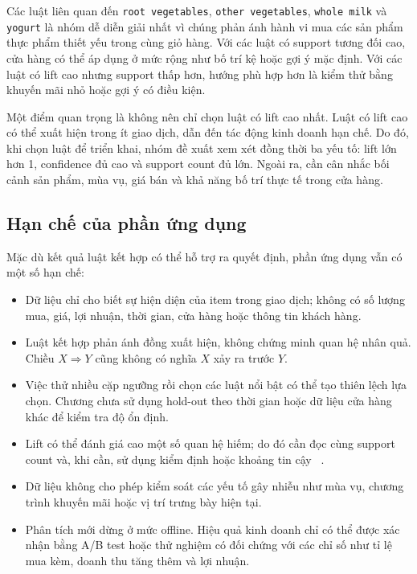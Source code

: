Các luật liên quan đến \texttt{root vegetables}, \texttt{other vegetables}, \texttt{whole milk} và \texttt{yogurt} là nhóm dễ diễn giải nhất vì chúng phản ánh hành vi mua các sản phẩm thực phẩm thiết yếu trong cùng giỏ hàng. Với các luật có support tương đối cao, cửa hàng có thể áp dụng ở mức rộng như bố trí kệ hoặc gợi ý mặc định. Với các luật có lift cao nhưng support thấp hơn, hướng phù hợp hơn là kiểm thử bằng khuyến mãi nhỏ hoặc gợi ý có điều kiện.

Một điểm quan trọng là không nên chỉ chọn luật có lift cao nhất. Luật có lift cao có thể xuất hiện trong ít giao dịch, dẫn đến tác động kinh doanh hạn chế. Do đó, khi chọn luật để triển khai, nhóm đề xuất xem xét đồng thời ba yếu tố: lift lớn hơn 1, confidence đủ cao và support count đủ lớn. Ngoài ra, cần cân nhắc bối cảnh sản phẩm, mùa vụ, giá bán và khả năng bố trí thực tế trong cửa hàng.

\subsection{Hạn chế của phần ứng dụng}
\label{subsec:application-limitations}

Mặc dù kết quả luật kết hợp có thể hỗ trợ ra quyết định, phần ứng dụng vẫn có một số hạn chế:

\begin{itemize}
    \item Dữ liệu chỉ cho biết sự hiện diện của item trong giao dịch; không có
          số lượng mua, giá, lợi nhuận, thời gian, cửa hàng hoặc thông tin khách
          hàng.
    \item Luật kết hợp phản ánh đồng xuất hiện, không chứng minh quan hệ nhân
          quả. Chiều $X\Rightarrow Y$ cũng không có nghĩa $X$ xảy ra trước $Y$.
    \item Việc thử nhiều cặp ngưỡng rồi chọn các luật nổi bật có thể tạo thiên
          lệch lựa chọn. Chương chưa sử dụng hold-out theo thời gian hoặc dữ liệu
          cửa hàng khác để kiểm tra độ ổn định.
    \item Lift có thể đánh giá cao một số quan hệ hiếm; do đó cần đọc cùng
          support count và, khi cần, sử dụng kiểm định hoặc khoảng tin cậy
          ~\cite{hahsler2008interest}.
    \item Dữ liệu không cho phép kiểm soát các yếu tố gây nhiễu như mùa vụ,
          chương trình khuyến mãi hoặc vị trí trưng bày hiện tại.
    \item Phân tích mới dừng ở mức offline. Hiệu quả kinh doanh chỉ có thể được
          xác nhận bằng A/B test hoặc thử nghiệm có đối chứng với các chỉ số như
          tỉ lệ mua kèm, doanh thu tăng thêm và lợi nhuận.
\end{itemize}

